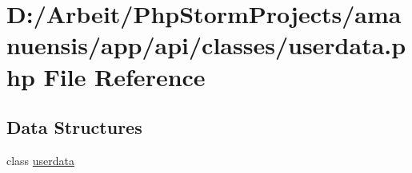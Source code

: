 \hypertarget{userdata_8php}{}\section{D\+:/\+Arbeit/\+Php\+Storm\+Projects/amanuensis/app/api/classes/userdata.php File Reference}
\label{userdata_8php}
\subsection*{Data Structures}
\begin{DoxyCompactItemize}
\item 
class \hyperlink{classuserdata}{userdata}
\end{DoxyCompactItemize}
